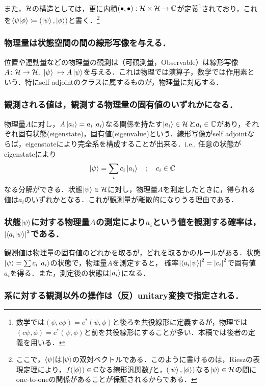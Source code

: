    また，$\mathcal{H}$の構造としては，更に内積$(\bullet,\bullet):\mathcal{H}\times\mathcal{H}\to\mathbb{C}$が定義\footnote{数学では$(\psi,c\phi)=c^{*}(\psi,\phi)$と後ろを共役線形に定義するが，物理では$(c\psi,\phi)=c^{*}(\psi,\phi)$と前を共役線形にすることが多い．本稿では後者の定義を用いる．}されており，これを$\braket{\psi}{\phi}\coloneqq(\ket{\psi},\ket{\phi})$と書く．\footnote{ここで，$\bra{\psi}$は$\ket{\psi}$の双対ベクトルである．このように書けるのは，Rieszの表現定理により，$f(\ket{\phi})\in\mathbb{C}$なる線形汎関数$f$と，$(\ket{\psi},\ket{\phi})$なる$\ket{\psi}\in\mathcal{H}$の間にone-to-oneの関係があることが保証されるからである．}
    
    \subsubsection*{物理量は状態空間の間の線形写像を与える．}
    
    位置や運動量などの物理量の観測は（可観測量，Observable）は線形写像$A\colon\mathcal{H}\to\mathcal{H},\ \ket{\psi}\ \mapsto A\ket{\psi}$を与える．これは物理では演算子，数学では作用素という．特にself adjointのクラスに属するものが，物理量に対応する．
    \subsubsection*{観測される値は，観測する物理量の固有値のいずれかになる．}
    物理量$A$に対し，$A\ket{a_i}=a_i\ket{a_i}$なる関係を持たす$\ket{a_i}\in\mathcal{H}$と$a_i\in\mathbb{C}$があり，それぞれ固有状態(eigenstate)，固有値(eigenvalue)という．線形写像がself adjointならば，eigenstateにより完全系を構成することが出来る．i.e., 任意の状態がeigenstateにより
    \begin{align}
        \ket{\psi}=\sum_{i}c_i\ket{a_i}\quad;\quad c_i\in\mathbb{C}
    \end{align}
    なる分解ができる．状態$\ket{\psi}\in\mathcal{H}$に対し，物理量$A$を測定したときに，得られる値は$a_i$のいずれかとなる．これが観測量が離散的になりうる理由である．
    \subsubsection*{状態$\ket{\psi}$に対する物理量$A$の測定により$a_i$という値を観測する確率は，$\abs{\braket{a_i}{\psi}}^2$である．}
    
    観測値は物理量の固有値のどれかを取るが，どれを取るかのルールがある．状態$\ket{\psi}=\sum c_i\ket{a_i}$の状態で，物理量$A$を測定すると， 確率$\abs{\braket{a_i}{\psi}}^2=\abs{c_i}^2$で固有値$a_i$を得る．また，測定後の状態は$\ket{a_i}$になる．
    \subsubsection{系に対する観測以外の操作は（反）unitary変換で指定される．}
    
